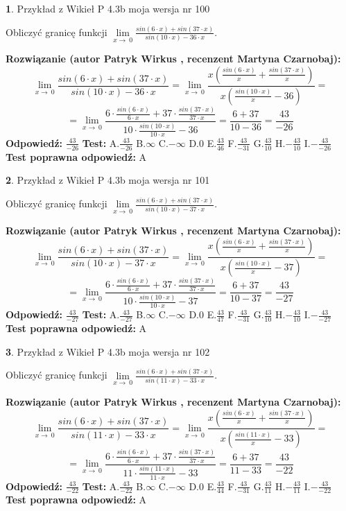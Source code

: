 \documentclass[12pt, a4paper]{article}
\theoremstyle{definition} %
\newtheorem{zad}{}
\newcommand{\zadStart}[1]{\begin{zad}#1\newline}
\newcommand{\zadStop}{\end{zad}}
\newcommand{\rozwStart}[2]{\noindent \textbf{Rozwiązanie (autor #1 , recenzent #2): }\newline}
\newcommand{\rozwStop}{\newline}
\newcommand{\odpStart}{\noindent \textbf{Odpowiedź:}\newline}
\newcommand{\odpStop}{\newline}
\newcommand{\testStart}{\noindent \textbf{Test:}\newline}
\newcommand{\testStop}{\newline}
\newcommand{\kluczStart}{\noindent \textbf{Test poprawna odpowiedź:}\newline}
\newcommand{\kluczStop}{\newline}
\begin{document}
\zadStart{Przykład z Wikieł P 4.3b moja wersja nr 100}


Obliczyć granicę funkcji $\lim\limits_{x\to\ 0}\frac{sin(6 \cdot x)+sin(37 \cdot x)}{sin(10 \cdot x)-36 \cdot x}$.
\zadStop
\rozwStart{Patryk Wirkus}{Martyna Czarnobaj}
$$\lim\limits_{x\to\ 0}\frac{sin(6 \cdot x)+sin(37 \cdot x)}{sin(10 \cdot x)-36 \cdot x}=\lim\limits_{x\to\ 0}\frac{x(\frac{sin(6 \cdot x)}{x}+\frac{sin(37 \cdot x)}{x})}{x(\frac{sin(10 \cdot x)}{x}-36)}=$$
$$=\lim\limits_{x\to\ 0}\frac{6 \cdot \frac{sin(6 \cdot x)}{6 \cdot x}+37 \cdot \frac{sin(37 \cdot x)}{37 \cdot x}}{10 \cdot \frac{sin(10 \cdot x)}{10 \cdot x}-36}=\frac{6+37}{10-36} = \frac{43}{-26}$$
\rozwStop
\odpStart
$\frac{43}{-26}$
\odpStop
\testStart
A.$\frac{43}{-26}$
B.$\infty$
C.$-\infty$
D.$0$
E.$\frac{43}{46}$
F.$\frac{43}{-31}$
G.$\frac{43}{10}$
H.$-\frac{43}{10}$
I.$-\frac{43}{-26}$
\testStop
\kluczStart
A
\kluczStop



\zadStart{Przykład z Wikieł P 4.3b moja wersja nr 101}


Obliczyć granicę funkcji $\lim\limits_{x\to\ 0}\frac{sin(6 \cdot x)+sin(37 \cdot x)}{sin(10 \cdot x)-37 \cdot x}$.
\zadStop
\rozwStart{Patryk Wirkus}{Martyna Czarnobaj}
$$\lim\limits_{x\to\ 0}\frac{sin(6 \cdot x)+sin(37 \cdot x)}{sin(10 \cdot x)-37 \cdot x}=\lim\limits_{x\to\ 0}\frac{x(\frac{sin(6 \cdot x)}{x}+\frac{sin(37 \cdot x)}{x})}{x(\frac{sin(10 \cdot x)}{x}-37)}=$$
$$=\lim\limits_{x\to\ 0}\frac{6 \cdot \frac{sin(6 \cdot x)}{6 \cdot x}+37 \cdot \frac{sin(37 \cdot x)}{37 \cdot x}}{10 \cdot \frac{sin(10 \cdot x)}{10 \cdot x}-37}=\frac{6+37}{10-37} = \frac{43}{-27}$$
\rozwStop
\odpStart
$\frac{43}{-27}$
\odpStop
\testStart
A.$\frac{43}{-27}$
B.$\infty$
C.$-\infty$
D.$0$
E.$\frac{43}{47}$
F.$\frac{43}{-31}$
G.$\frac{43}{10}$
H.$-\frac{43}{10}$
I.$-\frac{43}{-27}$
\testStop
\kluczStart
A
\kluczStop



\zadStart{Przykład z Wikieł P 4.3b moja wersja nr 102}


Obliczyć granicę funkcji $\lim\limits_{x\to\ 0}\frac{sin(6 \cdot x)+sin(37 \cdot x)}{sin(11 \cdot x)-33 \cdot x}$.
\zadStop
\rozwStart{Patryk Wirkus}{Martyna Czarnobaj}
$$\lim\limits_{x\to\ 0}\frac{sin(6 \cdot x)+sin(37 \cdot x)}{sin(11 \cdot x)-33 \cdot x}=\lim\limits_{x\to\ 0}\frac{x(\frac{sin(6 \cdot x)}{x}+\frac{sin(37 \cdot x)}{x})}{x(\frac{sin(11 \cdot x)}{x}-33)}=$$
$$=\lim\limits_{x\to\ 0}\frac{6 \cdot \frac{sin(6 \cdot x)}{6 \cdot x}+37 \cdot \frac{sin(37 \cdot x)}{37 \cdot x}}{11 \cdot \frac{sin(11 \cdot x)}{11 \cdot x}-33}=\frac{6+37}{11-33} = \frac{43}{-22}$$
\rozwStop
\odpStart
$\frac{43}{-22}$
\odpStop
\testStart
A.$\frac{43}{-22}$
B.$\infty$
C.$-\infty$
D.$0$
E.$\frac{43}{44}$
F.$\frac{43}{-31}$
G.$\frac{43}{11}$
H.$-\frac{43}{11}$
I.$-\frac{43}{-22}$
\testStop
\kluczStart
A
\kluczStop
\end{document}
